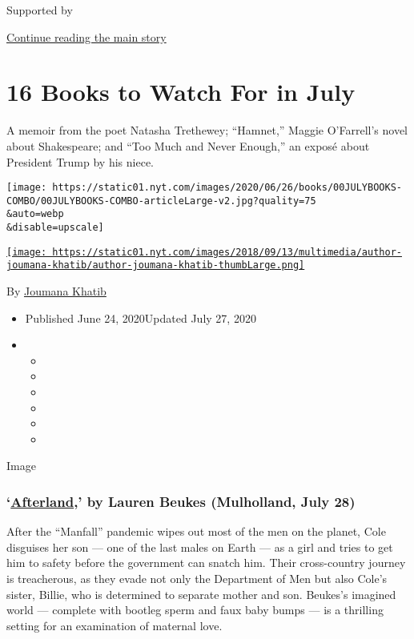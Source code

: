 Supported by

\protect\hyperlink{after-sponsor}{Continue reading the main story}

\hypertarget{16-books-to-watch-for-in-july}{%
\section{16 Books to Watch For in
July}\label{16-books-to-watch-for-in-july}}

A memoir from the poet Natasha Trethewey; ``Hamnet,'' Maggie O'Farrell's
novel about Shakespeare; and ``Too Much and Never Enough,'' an exposé
about President Trump by his niece.

\texttt{[image: https://static01.nyt.com/images/2020/06/26/books/00JULYBOOKS-COMBO/00JULYBOOKS-COMBO-articleLarge-v2.jpg?quality=75\\\&auto=webp\\\&disable=upscale]}

\href{https://nytimes.com/by/joumana-khatib}{\texttt{[image: https://static01.nyt.com/images/2018/09/13/multimedia/author-joumana-khatib/author-joumana-khatib-thumbLarge.png]}}

By \href{https://nytimes.com/by/joumana-khatib}{Joumana Khatib}

\begin{itemize}
\item
  Published June 24, 2020Updated July 27, 2020
\item
  \begin{itemize}
  \item
  \item
  \item
  \item
  \item
  \item
  \end{itemize}
\end{itemize}

Image

\hypertarget{afterland-by-lauren-beukes-mulholland-july-28}{%
\subsubsection{\texorpdfstring{`\href{https://www.mulhollandbooks.com/titles/lauren-beukes/afterland/9780316267847/}{Afterland},'
by Lauren Beukes (Mulholland, July
28)}{`Afterland,' by Lauren Beukes (Mulholland, July 28)}}\label{afterland-by-lauren-beukes-mulholland-july-28}}

After the ``Manfall'' pandemic wipes out most of the men on the planet,
Cole disguises her son --- one of the last males on Earth --- as a girl
and tries to get him to safety before the government can snatch him.
Their cross-country journey is treacherous, as they evade not only the
Department of Men but also Cole's sister, Billie, who is determined to
separate mother and son. Beukes's imagined world --- complete with
bootleg sperm and faux baby bumps --- is a thrilling setting for an
examination of maternal love.

